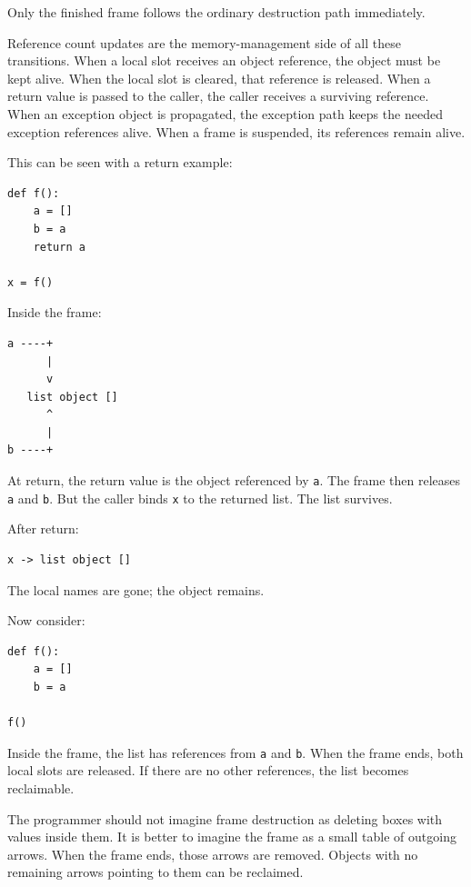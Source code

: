 Only the finished frame follows the ordinary destruction path immediately.

Reference count updates are the memory-management side of all these transitions. When a local slot receives an object reference, the object must be kept alive. When the local slot is cleared, that reference is released. When a return value is passed to the caller, the caller receives a surviving reference. When an exception object is propagated, the exception path keeps the needed exception references alive. When a frame is suspended, its references remain alive.

This can be seen with a return example:

\begin{verbatim}
def f():
    a = []
    b = a
    return a

x = f()
\end{verbatim}

Inside the frame:

\begin{verbatim}
a ----+
      |
      v
   list object []
      ^
      |
b ----+
\end{verbatim}

At return, the return value is the object referenced by \texttt{a}. The frame then releases \texttt{a} and \texttt{b}. But the caller binds \texttt{x} to the returned list. The list survives.

After return:

\begin{verbatim}
x -> list object []
\end{verbatim}

The local names are gone; the object remains.

Now consider:

\begin{verbatim}
def f():
    a = []
    b = a

f()
\end{verbatim}

Inside the frame, the list has references from \texttt{a} and \texttt{b}. When the frame ends, both local slots are released. If there are no other references, the list becomes reclaimable.

The programmer should not imagine frame destruction as deleting boxes with values inside them. It is better to imagine the frame as a small table of outgoing arrows. When the frame ends, those arrows are removed. Objects with no remaining arrows pointing to them can be reclaimed.

